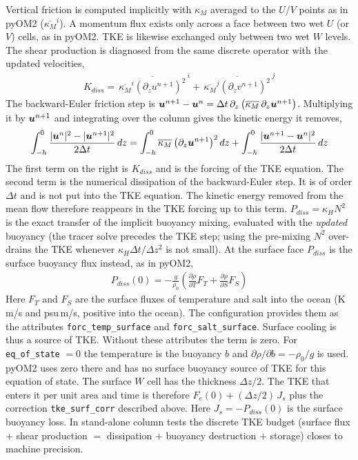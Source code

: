 \documentclass[12pt]{article}
\newcommand{\beq}  { \begin{eqnarray} }
\newcommand{\eeq}  { \end{eqnarray}}
\newcommand{\beeq}  { \begin{eqnarray*} }
\newcommand{\eeeq}  { \end{eqnarray*}}
\renewcommand{\v}[1]{{\mbox{\boldmath$ #1 $}}}  %
\newcommand{\pz}[1]{{\partial_z #1}}
\newcommand{\Bar}[1]{ \overline{ #1} }
\newcommand{\p}{{\partial}}
\newcommand{\lk}{\left(}
\newcommand{\rk}{\right)}
\begin{document}
Vertical friction is
computed implicitly with $\kappa_M$ averaged to the $U$/$V$ points as in
pyOM2 ($\overline{\kappa_M}^i$).
A momentum flux exists only across a face between two wet $U$ (or $V$) cells, as in pyOM2.
TKE is likewise exchanged only between two wet $W$ levels.
The shear production is diagnosed
from the same discrete operator with the updated velocities,
\beq
 K_{diss} = \Bar{\, \overline{\kappa_M}^i \lk \pz{u^{n+1}} \rk^2 \,}^i
          + \Bar{\, \overline{\kappa_M}^j \lk \pz{v^{n+1}} \rk^2 \,}^j
\eeq
The backward-Euler friction step is $\v u^{n+1} - \v u^n = \Delta t\, \pz{} \lk \overline{\kappa_M}\, \pz{\v u^{n+1}} \rk$.
Multiplying it by $\v u^{n+1}$ and integrating over the column gives the kinetic energy it removes,
\beeq
 \int_{-h}^0 \frac{|\v u^n|^2 - |\v u^{n+1}|^2}{2 \Delta t}\, dz
 = \int_{-h}^0 \overline{\kappa_M} \lk \pz{\v u^{n+1}} \rk^2 dz
 + \int_{-h}^0 \frac{|\v u^{n+1} - \v u^n|^2}{2 \Delta t}\, dz
\eeeq
The first term on the right is $K_{diss}$ and is the forcing of the TKE equation.
The second term is the numerical dissipation of the backward-Euler step.
It is of order $\Delta t$ and is not put into the TKE equation.
The kinetic energy removed from the mean flow therefore reappears in the TKE forcing
up to this term. $P_{diss} = \kappa_H N^2$ is the
exact transfer of the implicit buoyancy mixing, evaluated with the
\emph{updated} buoyancy (the tracer solve precedes the TKE step; using the
pre-mixing $N^2$ over-drains the TKE whenever $\kappa_H \Delta t/\Delta z^2$
is not small).
At the surface face $P_{diss}$ is the surface buoyancy flux instead, as in pyOM2,
\beeq
 P_{diss}(0) = - \frac{g}{\rho_0} \lk \frac{\p \rho}{\p T} F_T + \frac{\p \rho}{\p S} F_S \rk
\eeeq
Here $F_T$ and $F_S$ are the surface fluxes of temperature and salt into the ocean
(K\,m/s and psu\,m/s, positive into the ocean).
The configuration provides them as the attributes \verb|forc_temp_surface| and \verb|forc_salt_surface|.
Surface cooling is thus a source of TKE.
Without these attributes the term is zero.
For \verb|eq_of_state| $=0$ the temperature is the buoyancy $b$ and $\p \rho / \p b = -\rho_0/g$ is used.
pyOM2 uses zero there and has no surface buoyancy source of TKE for this equation of state.
The surface $W$ cell has the thickness $\Delta z/2$.
The TKE that enters it per unit area and time is therefore
$F_e(0) + (\Delta z/2)\, J_s$ plus the correction \verb|tke_surf_corr| described above.
Here $J_s = - P_{diss}(0)$ is the surface buoyancy loss.
In stand-alone column
tests the discrete TKE budget (surface flux $+$ shear production $=$
dissipation $+$ buoyancy destruction $+$ storage) closes to machine
precision.
\end{document}
